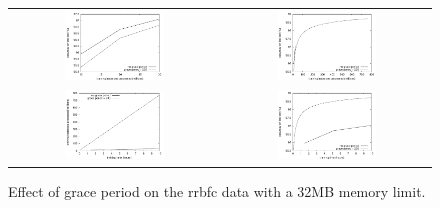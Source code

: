 \begin{figure}
\centering
\begin{tabular}{c@{}c}
\includegraphics[width=0.5\textwidth]{figures/gp_rrbfc_acc_examples} &
\includegraphics[width=0.5\textwidth]{figures/gp_rrbfc_acc_examples_fullrange} \\
\includegraphics[width=0.5\textwidth]{figures/gp_rrbfc_time} &
\includegraphics[width=0.5\textwidth]{figures/gp_rrbfc_acc_time} \\
\end{tabular}
\caption{Effect of grace period on the {\sc rrbfc} data with a 32MB memory limit.}
\label{fig:rrbfc_gp}
\end{figure}


